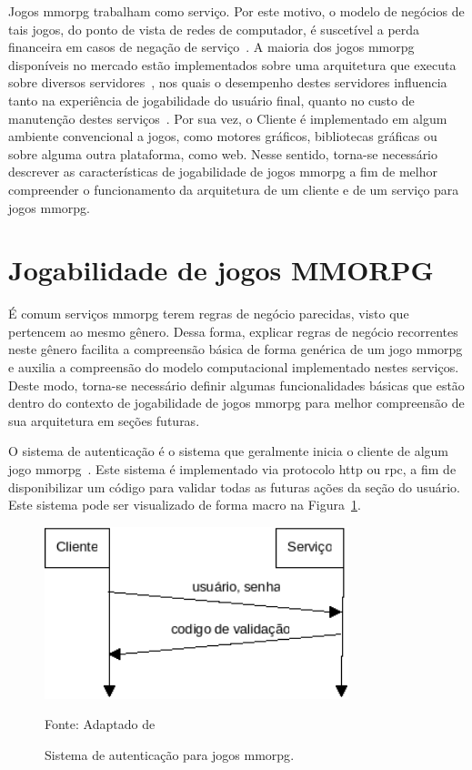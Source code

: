 Jogos \ac{mmorpg} trabalham como serviço.
%
Por este motivo, o modelo de negócios de tais jogos, do ponto de vista de redes de computador, é suscetível a perda financeira em casos de negação de serviço~\cite{1417630}.
%
A maioria dos jogos \ac{mmorpg} disponíveis no mercado estão implementados sobre uma arquitetura que executa sobre diversos servidores~\cite{stephenclarkewillson2017}, nos quais o desempenho destes servidores influencia tanto na experiência de jogabilidade do usuário final, quanto no custo de manutenção destes serviços~\cite{1417630}.
%
Por sua vez, o Cliente é implementado em algum ambiente convencional a jogos, como motores gráficos, bibliotecas gráficas ou sobre alguma outra plataforma, como web.
%
Nesse sentido, torna-se necessário descrever as características de jogabilidade de jogos \ac{mmorpg} a fim de melhor compreender o funcionamento da arquitetura de um cliente e de um serviço para jogos \ac{mmorpg}.



\section{Jogabilidade de jogos MMORPG}
\label{sec:jogabilidade}



É comum serviços \ac{mmorpg} terem regras de negócio parecidas, visto que pertencem ao mesmo gênero.
%
Dessa forma, explicar regras de negócio recorrentes neste gênero facilita a compreensão básica de forma genérica de um jogo \ac{mmorpg} e auxilia a compreensão do modelo computacional implementado nestes serviços.
%
Deste modo, torna-se necessário definir algumas funcionalidades básicas que estão dentro do contexto de jogabilidade de jogos \ac{mmorpg} para melhor compreensão de sua arquitetura em seções futuras.


O sistema de autenticação é o sistema que geralmente inicia o cliente de algum jogo \ac{mmorpg}~\cite{albion_online_unite, matthiasrudy2011}.
%
Este sistema é implementado via protocolo \ac{http} ou \ac{rpc}, a fim de disponibilizar um código para validar todas as futuras ações da seção do usuário.
%
Este sistema pode ser visualizado de forma macro na Figura~\ref{fig:autenticacao}.

\begin{figure}[htb!]
\caption{Sistema de autenticação para jogos \ac{mmorpg}.}
\label{fig:autenticacao}
\includegraphics[height=5cm]{img/cap2/autenticacao.png}
\centering

Fonte: Adaptado de ~\cite{LeckyThompson2008Nov}
\end{figure}


